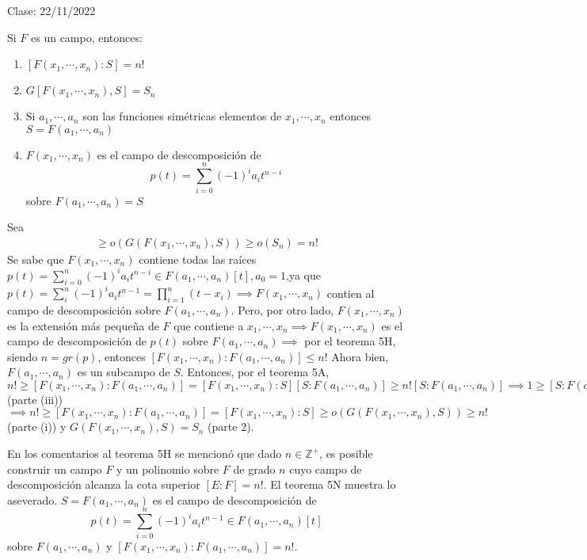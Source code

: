 Clase: 22/11/2022

\begin{teorema}[5N]
    Si $F$ es un campo, entonces:
    \begin{enumerate}
        \item $[F(x_1,\cdots, x_n):S]=n!$
        \item $G[F(x_1,\cdots, x_n),S]=S_n$
        \item Si $a_1,\cdots, a_n$ son las funciones simétricas elementos de $x_1,\cdots,x_n$ entonces $S=F(a_1,\cdots,a_n)$
        \item $F(x_1,\cdots,x_n)$ es el campo de descomposición de 
        $$p(t)=\sum_{i=0}^n (-1)^i a_i t^{n-i}$$
        sobre $F(a_1,\cdots,a_n)=S$
    \end{enumerate}
    \begin{dem}
        Sea 
        \begin{align*}
            [F(x_1,\cdots,x_n):S]\geq o(G(F(x_1,\cdots,x_n),S))\geq o(S_n)=n!
        \end{align*}
        Se sabe que $F(x_1,\cdots, x_n)$ contiene todas las raíces $p(t)=\sum_{i=0}^n(-1)^i a_i t^{n-i}\in F(a_1,\cdots,a_n)[t],a_0=1$,ya que $p(t)=\sum_{i}^n (-1)^i a_i t^{n-1}=\prod_{i=1}^n(t-x_i)\implies F(x_1,\cdots,x_n)$ contien al campo de descomposición sobre $F(a_1,\cdots,a_n)$. Pero, por otro lado, $F(x_1,\cdots,x_n)$ es la extensión más pequeña de $F$ que contiene a $x_1,\cdots, x_n\implies F(x_1,\cdots,x_n)$ es el campo de descomposición de $p(t)$ sobre $F(a_1,\cdots,a_n)\implies$ por el teorema 5H, siendo $n=gr(p)$, entonces $[F(x_1,\cdots,x_n):F(a_1,\cdots, a_n)]\leq n!$ Ahora bien, $F(a_1,\cdots,a_n)$ es un subcampo de $S$. Entonces, por el teorema 5A, $n!\geq [F(x_1,\cdots,x_n):F(a_1,\cdots,a_n)]=[F(x_1,\cdots,x_n):S][S:F(a_1,\cdots,a_n)]\geq n![S:F(a_1,\cdots,a_n)]\implies 1\geq [S:F(a_1,\cdots,a_n)]\implies [S:F(a_1,\cdots,a_n)]=1\implies S=F(a_1,\cdots,a_n)$ (parte (iii)) $\implies n!\geq [F(x_1,\cdots,x_n):F(a_1,\cdots, a_n)]=[F(x_1,\cdots, x_n):S]\geq o(G(F(x_1,\cdots, x_n),S))\geq n!$ (parte (i)) y $G(F(x_1,\cdots,x_n),S)=S_n$ (parte 2).
    \end{dem}
\end{teorema}

\begin{cajita}
    \begin{nota}
        En los comentarios al teorema 5H se mencionó que dado $n\in\mathbb{Z}^+$, es posible construir un campo $F$ y un polinomio sobre $F$ de grado $n$ cuyo campo de descomposición alcanza la cota superior $[E:F]=n!$. El teorema 5N muestra lo aseverado. $S=F(a_1,\cdots,a_n)$ es el campo de descomposición de 
        $$p(t)=\sum_{i=0}^n (-1)^i a_i t^{n-1}\in F(a_1,\cdots,a_n)[t]$$
        sobre $F(a_1,\cdots, a_n)$ y $[F(x_1,\cdots,x_n):F(a_1,\cdots,a_n)]= n!$.
    \end{nota}
\end{cajita}

